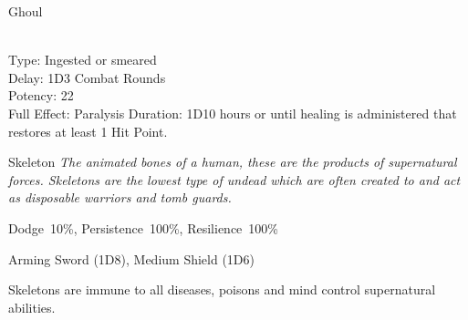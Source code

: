 \begin{samepage}
\begin{monsterbox}{Ghoul}
\begin{rpg-monsteraction}
	\end{rpg-monsteraction}
	\begin{rpg-monsteraction}
		\\Type: Ingested or smeared\\
		Delay: 1D3 Combat Rounds\\
                Potency: 22\\
		Full Effect: Paralysis
		Duration: 1D10 hours or until healing is administered that restores at least 1 Hit Point.
	\end{rpg-monsteraction}
\end{monsterbox}
\end{samepage}
	
\newpage


\begin{monsterbox}{Skeleton}
	\textit{The animated bones of a human, these are the products of supernatural forces. Skeletons are the lowest type of undead which are often created to and act as disposable warriors and tomb guards.}\\
	\rpghline
	\basics[%
        hitpoints  = 8, 
	majorwound = 4,
	damagemodifier = 0,
	powerpoints = 0,
	movementrate = 15m,
	armor = Leather (2AP),
	plunderrating = 0
	]
	\rpghline%
	\stats[ %
		STR = 2D6+6 (13),
		CON = 1D6   (4),
		DEX = 3D6   (11),
		SIZ = 3D6   (11),
		INT = 0     (0),
		POW = 0     (0),
		CHA = 0     (0)
	]
	\rpghline%
	\begin{rpg-monsteraction}[Resistances]
		Dodge~10\%, Persistence~100\%, Resilience~100\%
	\end{rpg-monsteraction}
	\begin{rpg-monsteraction}
		Arming Sword (1D8), Medium Shield (1D6)
	\end{rpg-monsteraction}
	\begin{rpg-monsteraction}[Immunities]
		Skeletons are immune to all diseases, poisons and mind control supernatural abilities.
	\end{rpg-monsteraction}

\end{monsterbox}

\newpage


